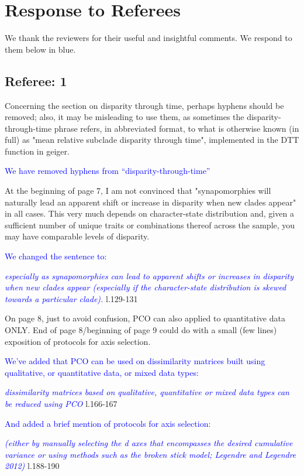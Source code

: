 \documentclass[12pt,letterpaper]{article}
\begin{document}
\section{Response to Referees}

We thank the reviewers for their useful and insightful comments. We respond to them below in blue.

\subsection{Referee: 1}
\noindent Concerning the section on disparity through time, perhaps hyphens should be removed; also, it may be misleading to use them, as sometimes the disparity-through-time phrase refers, in abbreviated format, to what is otherwise known (in full) as "mean relative subclade disparity through time", implemented in the DTT function in geiger.

\textcolor{blue}{We have removed hyphens from ``disparity-through-time''}

\noindent At the beginning of page 7, I am not convinced that "synapomorphies will naturally lead an apparent shift or increase in disparity when new clades appear" in all cases. This very much depends on character-state distribution and, given a sufficient number of unique traits or combinations thereof across the sample, you may have comparable levels of disparity.

\textcolor{blue}{We changed the sentence to:}

\textcolor{blue}{\textit{especially as synapomorphies can lead to apparent shifts or increases in disparity when new clades appear (especially if the character-state distribution is skewed towards a particular clade).}} l.129-131 %

\noindent On page 8, just to avoid confusion, PCO can also applied to quantitative data ONLY. End of page 8/beginning of page 9 could do with a small (few lines) exposition of protocols for axis selection.

\textcolor{blue}{We've added that PCO can be used on dissimilarity matrices built using qualitative, or quantitative data, or mixed data types:}

\textcolor{blue}{\textit{dissimilarity matrices based on qualitative, quantitative or mixed data types can be reduced using PCO}} l.166-167 %

\textcolor{blue}{And added a brief mention of protocols for axis selection:}

\textcolor{blue}{\textit{(either by manually selecting the d axes that encompasses the desired cumulative variance or using methods such as the broken stick model; Legendre and Legendre 2012)}} l.188-190 %
\end{document}
